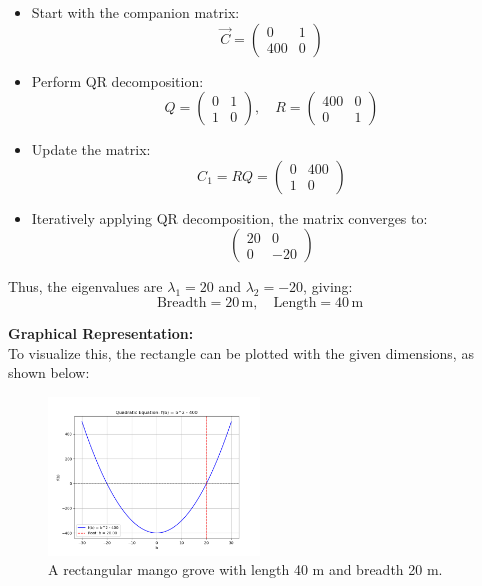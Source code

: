 \documentclass[journal]{IEEEtran}
\begin{document}
\begin{itemize}
    \item Start with the companion matrix:
    \[
    \vec{C} = \begin{pmatrix} 0 & 1 \\ 400 & 0 \end{pmatrix}
    \]
    \item Perform QR decomposition:
    \[
    Q = \begin{pmatrix} 0 & 1 \\ 1 & 0 \end{pmatrix}, \quad
    R = \begin{pmatrix} 400 & 0 \\ 0 & 1 \end{pmatrix}
    \]
    \item Update the matrix: 
    \[
    C_1 = RQ = \begin{pmatrix} 0 & 400 \\ 1 & 0 \end{pmatrix}
    \]
    \item Iteratively applying QR decomposition, the matrix converges to:
    \[
    \begin{pmatrix} 20 & 0 \\ 0 & -20 \end{pmatrix}
    \]
\end{itemize}

Thus, the eigenvalues are \( \lambda_1 = 20 \) and \( \lambda_2 = -20 \), giving:
\[
\text{Breadth} = 20 \, \text{m}, \quad \text{Length} = 40 \, \text{m}
\]




\textbf{Graphical Representation:}\\
To visualize this, the rectangle can be plotted with the given dimensions, as shown below:
\begin{figure}[ht] %
    \centering
    \includegraphics[width=0.5\textwidth]{figs/Figure_1.png} %
    \caption{A rectangular mango grove with length 40 m and breadth 20 m.}
    \label{fig:mango_grove}
\end{figure}
\end{document}
